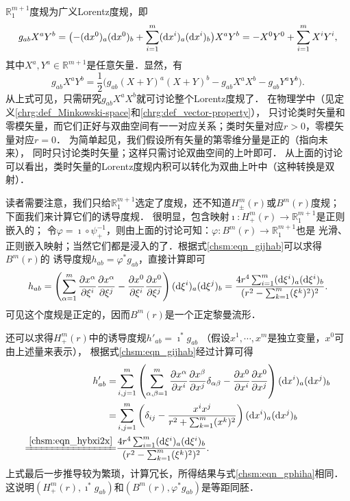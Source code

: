 $\mathbb{R}^{m+1}_1$度规为广义Lorentz度规，即
\begin{equation*}
    g_{ab}X^a Y^b = \bigl(-({\rm d}x^0)_a({\rm d}x^0)_b+ \sum_{i=1}^{m}({\rm d}x^i)_a({\rm d}x^i)_b\bigr)
    X^a Y^b=-X^0 Y^0 + \sum_{i=1}^{m} X^i Y^i,
\end{equation*}
其中$X^a, Y^a\in \mathbb{R}^{m+1}$是任意矢量．显然，有
\begin{equation}
    g_{ab}X^a Y^b = \frac{1}{2}\bigl(g_{ab}(X+Y)^a(X+Y)^b -g_{ab}X^a X^b -g_{ab}Y^a Y^b\bigr).
\end{equation}
从上式可见，只需研究$g_{ab}X^a X^b$就可讨论整个Lorentz度规了．
在物理学中（见定义\ref{chrg:def_Minkowski-space}和\ref{chrg:def_vector-property}），
只讨论类时矢量和零模矢量，而它们正好与双曲空间有一一对应关系；类时矢量对应$r>0$，零模矢量对应$r=0$．
为简单起见，我们假设所有矢量的第零维分量是正的（指向未来），
同时只讨论类时矢量；这样只需讨论双曲空间的上叶即可．
从上面的讨论可以看出，类时矢量的Lorentz度规内积可以转化为双曲上叶中（这种转换是双射）．

读者需要注意，我们只给$\mathbb{R}^{m+1}_1$选定了度规，还不知道$H^m_{\pm}(r)$或$B^m(r)$度规；
下面我们来计算它们的诱导度规．
很明显，包含映射$\imath :H^m_{+}(r) \to \mathbb{R}^{m+1}_1$是正则嵌入的；
令$\varphi=\imath \circ \psi_{+}^{-1}$，则由上面的讨论可知：$\varphi:B^m(r)\to \mathbb{R}^{m+1}_1$也是
光滑、正则嵌入映射；当然它们都是浸入的了．根据式\eqref{chsm:eqn_gijhab}可以求得$B^m(r)$的
诱导度规$h_{ab}=\varphi^{*} g_{ab}$，直接计算即可
\begin{equation}\label{chsm:eqn_gphiha}
    h_{ab}= \left(\sum_{\alpha=1}^{m}\frac{\partial x^\alpha}{\partial \xi^i}
    \frac{\partial x^\alpha}{\partial \xi^j} -\frac{\partial x^0}{\partial \xi^i}
    \frac{\partial x^0}{\partial \xi^j} \right)
    ({\rm d}\xi^i)_a ({\rm d}\xi^j)_b
    = \frac{4r^4 \sum\nolimits_{i=1}^{m} ({\rm d}\xi^i)_a ({\rm d}\xi^i)_b} 
    {(r^2-\sum\nolimits_{k=1}^{m} (\xi^k)^2)^2}.
\end{equation}  %
可见这个度规是正定的，因而$B^m(r)$是一个正定黎曼流形．

还可以求得$H^m_{+}(r)$中的诱导度规$h'_{ab}=\imath ^* g_{ab}$
（假设$x^1,\cdots,x^m$是独立变量，$x^0$可由上述量来表示），
根据式\eqref{chsm:eqn_gijhab}经过计算可得
\begin{align}
        h'_{ab}=& \sum_{i,j=1}^{m}\left(\sum_{\alpha,\beta=1}^{m}\frac{\partial x^\alpha}{\partial x^i}
        \frac{\partial x^\beta}{\partial x^j}\delta_{\alpha\beta} -\frac{\partial x^0}{\partial x^i}
        \frac{\partial x^0}{\partial x^j} \right)    ({\rm d} x^i)_a ({\rm d} x^j)_b  \notag \\
        =& \sum_{i,j=1}^{m}\left(\delta_{ij}-\frac{x^i x^j}{r^2+\sum_{k=1}^{m}(x^k)^2}\right)
        ({\rm d} x^i)_a ({\rm d} x^j)_b \notag \\
        \xlongequal{\ref{chsm:eqn_hybxi2x}}&
        \frac{4r^4 \sum\nolimits_{i=1}^{m} ({\rm d}\xi^i)_a ({\rm d}\xi^i)_b} 
        {(r^2-\sum\nolimits_{k=1}^{m} (\xi^k)^2)^2}.       \label{chsm:eqn_gphihabb}
\end{align}
上式最后一步推导较为繁琐，计算冗长，所得结果与式\eqref{chsm:eqn_gphiha}相同．
这说明$(H^m_{+}(r),\imath ^* g_{ab})$和$(B^m(r),\varphi ^* g_{ab})$是等距同胚．

